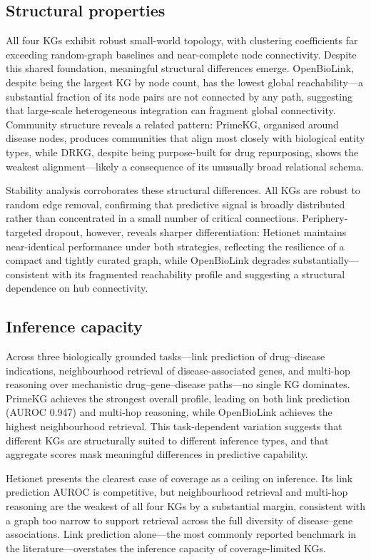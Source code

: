 \documentclass[10pt,a4paper]{article}
\begin{document}
\subsection{Structural properties}
All four KGs exhibit robust small-world topology, with clustering coefficients far exceeding random-graph baselines and near-complete node connectivity. Despite this shared foundation, meaningful structural differences emerge. OpenBioLink, despite being the largest KG by node count, has the lowest global reachability---a substantial fraction of its node pairs are not connected by any path, suggesting that large-scale heterogeneous integration can fragment global connectivity. Community structure reveals a related pattern: PrimeKG, organised around disease nodes, produces communities that align most closely with biological entity types, while DRKG, despite being purpose-built for drug repurposing, shows the weakest alignment---likely a consequence of its unusually broad relational schema.

Stability analysis corroborates these structural differences. All KGs are robust to random edge removal, confirming that predictive signal is broadly distributed rather than concentrated in a small number of critical connections. Periphery-targeted dropout, however, reveals sharper differentiation: Hetionet maintains near-identical performance under both strategies, reflecting the resilience of a compact and tightly curated graph, while OpenBioLink degrades substantially---consistent with its fragmented reachability profile and suggesting a structural dependence on hub connectivity.

\subsection{Inference capacity}
Across three biologically grounded tasks---link prediction of drug--disease indications, neighbourhood retrieval of disease-associated genes, and multi-hop reasoning over mechanistic drug--gene--disease paths---no single KG dominates. PrimeKG achieves the strongest overall profile, leading on both link prediction (AUROC 0.947) and multi-hop reasoning, while OpenBioLink achieves the highest neighbourhood retrieval. This task-dependent variation suggests that different KGs are structurally suited to different inference types, and that aggregate scores mask meaningful differences in predictive capability.

Hetionet presents the clearest case of coverage as a ceiling on inference. Its link prediction AUROC is competitive, but neighbourhood retrieval and multi-hop reasoning are the weakest of all four KGs by a substantial margin, consistent with a graph too narrow to support retrieval across the full diversity of disease--gene associations. Link prediction alone---the most commonly reported benchmark in the literature---overstates the inference capacity of coverage-limited KGs.
\end{document}
